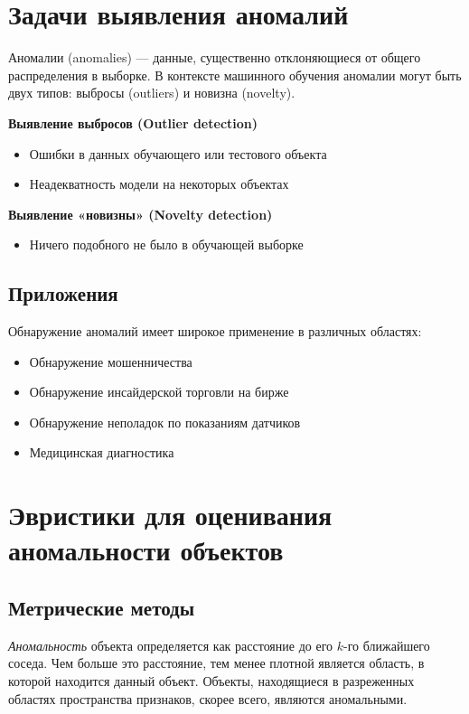 
\section{Задачи выявления аномалий}

Аномалии (anomalies) --- данные, существенно отклоняющиеся от общего распределения в выборке. В контексте машинного обучения аномалии могут быть двух типов: выбросы (outliers) и новизна (novelty).

\textbf{Выявление выбросов (Outlier detection)}

\begin{itemize}
\item Ошибки в данных обучающего или тестового объекта
\item Неадекватность модели на некоторых объектах
\end{itemize}

\textbf{Выявление «новизны» (Novelty detection)}

\begin{itemize}
\item Ничего подобного не было в обучающей выборке
\end{itemize}


\subsection{Приложения}

Обнаружение аномалий имеет широкое применение в различных областях:

\begin{itemize}
    \item Обнаружение мошенничества
    \item Обнаружение инсайдерской торговли на бирже
    \item Обнаружение неполадок по показаниям датчиков
    \item Медицинская диагностика
\end{itemize}

\section{Эвристики для оценивания аномальности объектов}

\subsection{Метрические методы}

\textit{Аномальность} объекта определяется как расстояние до его $k$-го ближайшего соседа. Чем больше это расстояние, тем менее плотной является область, в которой находится данный объект. Объекты, находящиеся в разреженных областях пространства признаков, скорее всего, являются аномальными.


